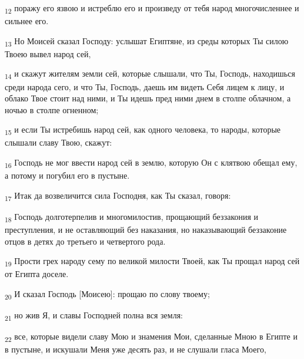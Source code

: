 \begin{tcolorbox}
\textsubscript{12} поражу его язвою и истреблю его и произведу от тебя народ многочисленнее и сильнее его.
\end{tcolorbox}
\begin{tcolorbox}
\textsubscript{13} Но Моисей сказал Господу: услышат Египтяне, из среды которых Ты силою Твоею вывел народ сей,
\end{tcolorbox}
\begin{tcolorbox}
\textsubscript{14} и скажут жителям земли сей, которые слышали, что Ты, Господь, находишься среди народа сего, и что Ты, Господь, даешь им видеть Себя лицем к лицу, и облако Твое стоит над ними, и Ты идешь пред ними днем в столпе облачном, а ночью в столпе огненном;
\end{tcolorbox}
\begin{tcolorbox}
\textsubscript{15} и если Ты истребишь народ сей, как одного человека, то народы, которые слышали славу Твою, скажут:
\end{tcolorbox}
\begin{tcolorbox}
\textsubscript{16} Господь не мог ввести народ сей в землю, которую Он с клятвою обещал ему, а потому и погубил его в пустыне.
\end{tcolorbox}
\begin{tcolorbox}
\textsubscript{17} Итак да возвеличится сила Господня, как Ты сказал, говоря:
\end{tcolorbox}
\begin{tcolorbox}
\textsubscript{18} Господь долготерпелив и многомилостив, прощающий беззакония и преступления, и не оставляющий без наказания, но наказывающий беззаконие отцов в детях до третьего и четвертого рода.
\end{tcolorbox}
\begin{tcolorbox}
\textsubscript{19} Прости грех народу сему по великой милости Твоей, как Ты прощал народ сей от Египта доселе.
\end{tcolorbox}
\begin{tcolorbox}
\textsubscript{20} И сказал Господь [Моисею]: прощаю по слову твоему;
\end{tcolorbox}
\begin{tcolorbox}
\textsubscript{21} но жив Я, и славы Господней полна вся земля:
\end{tcolorbox}
\begin{tcolorbox}
\textsubscript{22} все, которые видели славу Мою и знамения Мои, сделанные Мною в Египте и в пустыне, и искушали Меня уже десять раз, и не слушали гласа Моего,
\end{tcolorbox}
